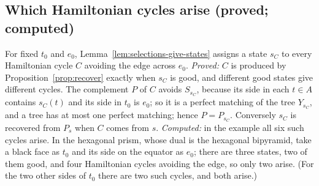 \documentclass[10pt]{amsart}
\numberwithin{equation}{section}
\theoremstyle{definition}
\theoremstyle{remark}
\begin{document}
\subsection*{Which Hamiltonian cycles arise (proved; computed)}
For fixed $t_0$ and $e_0$, Lemma~\ref{lem:selections-give-states} assigns a state $s_C$ to every Hamiltonian cycle $C$ avoiding the edge across $e_0$.
\emph{Proved:} $C$ is produced by Proposition~\ref{prop:recover} exactly when $s_C$ is good, and different good states give different cycles.
The complement $P$ of $C$ avoids $S_{s_C}$, because its side in each $t\in A$ contains $s_C(t)$ and its side in $t_0$ is $e_0$; so it is a perfect matching of the tree $Y_{s_C}$, and a tree has at most one perfect matching; hence $P=P_{s_C}$.
Conversely $s_{C}$ is recovered from $P_s$ when $C$ comes from $s$.
\emph{Computed:} in the example all six such cycles arise.
In the hexagonal prism, whose dual is the hexagonal bipyramid, take a black face as $t_0$ and its side on the equator as $e_0$; there are three states, two of them good, and four Hamiltonian cycles avoiding the edge, so only two arise.
(For the two other sides of $t_0$ there are two such cycles, and both arise.)
\end{document}
